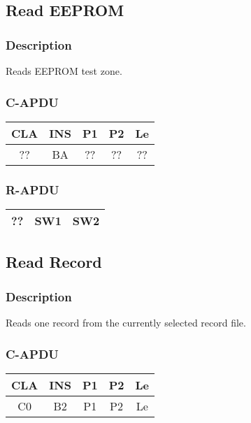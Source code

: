 \documentclass[a4paper,oneside]{article}
\begin{document}

\subsection{Read EEPROM}

\subsubsection*{Description}

Reads EEPROM test zone.

\subsubsection*{C-APDU}

\begin{tabular}{|c|c|c|c|c|} \hline
CLA & INS & P1 & P2 & Le \\ \hline \hline
?? & BA & ?? & ?? & ?? \\ \hline
\end{tabular}

\subsubsection*{R-APDU}

\begin{tabular}{|c|c|c|} \hline
?? & SW1 & SW2 \\ \hline
\end{tabular}


\subsection{Read Record}

\subsubsection*{Description}

Reads one record from the currently selected record file.

\subsubsection*{C-APDU}

\begin{tabular}{|c|c|c|c|c|} \hline
CLA & INS & P1 & P2 & Le \\ \hline \hline
C0 & B2 & P1 & P2 & Le \\ \hline
\end{tabular}
\end{document}
